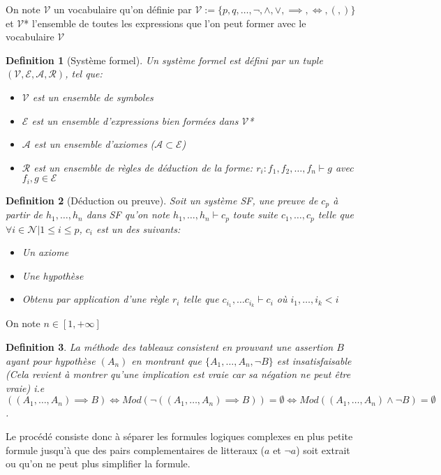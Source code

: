 \documentclass{paper}
\newtheorem{defi}{Definition}
\begin{document}
On note $\mathcal{V}$ un vocabulaire qu'on définie par $\mathcal{V} := \{p, q,\dots, \lnot, \land, \lor, \implies, \Leftrightarrow, (,) \}$ et $\mathcal{V}$* l'ensemble de toutes les expressions que l'on peut former avec le vocabulaire $\mathcal{V}$
\begin{defi}[Système formel]
    Un système formel est défini par un tuple $(\mathcal{V}, \mathcal{E}, \mathcal{A}, \mathcal{R})$, tel que:
    \begin{itemize}
        \item $\mathcal{V}$ est un ensemble de symboles
        \item $\mathcal{E}$ est un ensemble d'expressions bien formées dans $\mathcal{V}$*
        \item $\mathcal{A}$ est un ensemble d'axiomes ($\mathcal{A} \subset \mathcal{E}$)
        \item $\mathcal{R}$ est un ensemble de règles de déduction de la forme: $r_i : f_1, f_2,\dots, f_n \vdash g$ avec $f_i, g \in \mathcal{E}$
    \end{itemize}
\end{defi}

\begin{defi}[Déduction ou preuve]
    Soit un système SF, une preuve de $c_p$ à partir de $h_1,\dots,h_n$ dans SF qu'on note $h_1,\dots, h_n \vdash c_p$
    toute suite $c_1,\dots,c_p$ telle que $\forall i\in\mathcal{N} | 1 \leq i \leq p$, $c_i$ est un des suivants:
    \begin{itemize}
        \item Un axiome
        \item Une hypothèse
        \item Obtenu par application d'une règle $r_i$ telle que $c_{i_1},\dots c_{i_k} \vdash c_i$ où $ i_1,\dots,i_k < i$
    \end{itemize}
\end{defi}
On note $n\in [ 1,+\infty ] $
\begin{defi}
    \textit{La méthode des tableaux} consistent en prouvant une assertion $B$ ayant pour hypothèse $(A_n)$ en montrant
    que $\{A_1,\dots,A_n, \lnot B\}$ est insatisfaisable (Cela revient à montrer qu'une implication est vraie car sa négation ne peut être vraie)
    i.e $((A_1,\dots,A_n)\implies B) \Leftrightarrow Mod(\lnot((A_1,\dots,A_n)\implies B)) = \emptyset \Leftrightarrow Mod((A_1,\dots,A_n)\land \lnot B) = \emptyset$.
\end{defi}

Le procédé consiste donc à séparer les formules logiques complexes en plus petite formule jusqu'à que des pairs complementaires de litteraux ($a$ et $\lnot a$) soit extrait ou qu'on ne peut plus simplifier la formule.
\end{document}
